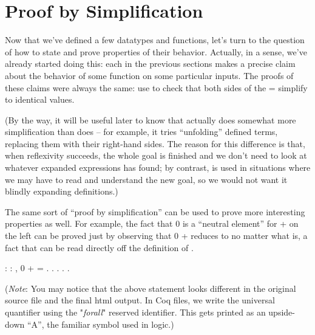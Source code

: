 \documentclass[12pt]{report}
\begin{document}
\section{Proof by Simplification}



 Now that we've defined a few datatypes and functions, let's
    turn to the question of how to state and prove properties of their
    behavior.  Actually, in a sense, we've already started doing this:
    each  in the previous sections makes a precise claim
    about the behavior of some function on some particular inputs.
    The proofs of these claims were always the same: use  
    to check that both sides of the = simplify to identical values. 


    (By the way, it will be useful later to know that
     actually does somewhat more simplification than  
    does -- for example, it tries ``unfolding'' defined terms, replacing them with
    their right-hand sides.  The reason for this difference is that,
    when reflexivity succeeds, the whole goal is finished and we don't
    need to look at whatever expanded expressions  has
    found; by contrast,  is used in situations where we may
    have to read and understand the new goal, so we would not want it
    blindly expanding definitions.) 


    The same sort of ``proof by simplification'' can be used to prove
    more interesting properties as well.  For example, the fact that
    0 is a ``neutral element'' for + on the left can be proved
    just by observing that 0 +  reduces to  no matter what
     is, a fact that can be read directly off the definition of .\begin{coqdoccode}
\coqdocemptyline
\coqdocnoindent
{}  : \coqdockw{\ensuremath{\forall}}  : , 0 +  = .\coqdoceol
\coqdocnoindent
{}.\coqdoceol
\coqdocindent{1.00em}
 . . .\coqdoceol
\coqdocemptyline
\end{coqdoccode}
(\textit{Note}: You may notice that the above statement looks
    different in the original source file and the final html output. In Coq
    files, we write the \coqdockw{\ensuremath{\forall}} universal quantifier using the
    "\textit{forall}" reserved identifier. This gets printed as an
    upside-down ``A'', the familiar symbol used in logic.)  
\end{document}
